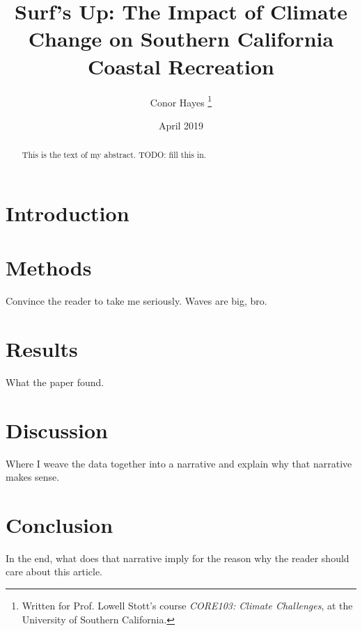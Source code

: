 \documentclass[12pt, letterpaper]{article}
\title{Surf's Up: The Impact of Climate Change on Southern California Coastal Recreation}
\author{Conor Hayes \thanks{Written for Prof. Lowell Stott's course \textit{CORE103: Climate Challenges}, at the University of Southern California.}}
\date{April 2019}
\begin{document}
	\maketitle

	\begin{abstract}
		This is the text of my abstract. TODO: fill this in.
	\end{abstract}

	\section{Introduction}


	\section{Methods}
	Convince the reader to take me seriously. Waves are big, bro.
	\cite{surfing-science}

	\section{Results}
	What the paper found. \cite{swells-deep-water-waves}

	\section {Discussion}
	Where I weave the data together into a narrative and explain why that narrative makes sense.

	\section {Conclusion}
	In the end, what does that narrative imply for the reason why the reader should care about this article.

	
	
\end{document}
